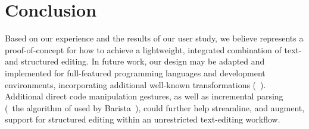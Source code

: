 \section{Conclusion}


Based on our experience and the results of our user study,
we believe \deuce{} represents a proof-of-concept for how to achieve a
lightweight, integrated combination of text- and structured editing. In future
work, our design may be adapted and implemented for full-featured programming
languages and development environments, incorporating additional well-known
transformations (\eg{}~\citet{Fowler1999,Thompson2013}). Additional direct code
manipulation gestures, as well as incremental parsing (\eg{}~the algorithm
of \citet{Wagner:1998} used by Barista~\citep{Barista}),
could further help streamline, and augment,
support for structured editing within an unrestricted text-editing workflow.

